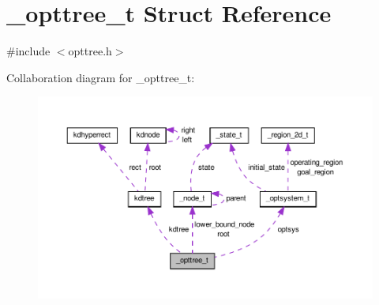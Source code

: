 \hypertarget{a00005}{\section{\-\_\-opttree\-\_\-t \-Struct \-Reference}
\label{dd/dad/a00005}
}


{\ttfamily \#include $<$opttree.\-h$>$}



\-Collaboration diagram for \-\_\-opttree\-\_\-t\-:
\nopagebreak
\begin{figure}[H]
\begin{center}
\leavevmode
\includegraphics[width=350pt]{d1/dc6/a00037}
\end{center}
\end{figure}
